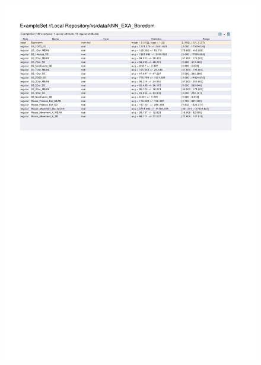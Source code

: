 \begin{figure}[htp]
  \centerline{\includegraphics[trim=0 570 0 60,clip,width=16.09cm]{results/kNN_EXA_Boredom.pdf}} \caption{
} \label{kNN_EXA_Boredom}
\end{figure}


